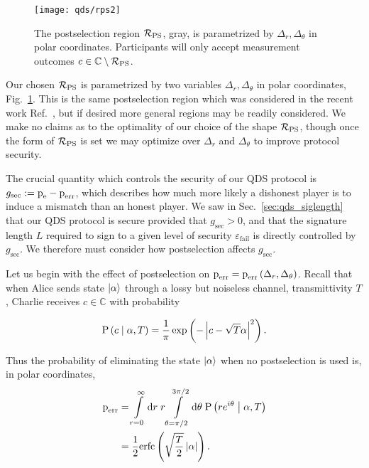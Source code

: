 \begin{figure}[htp]
\captionsetup{width=0.8\linewidth}
\centering
\texttt{[image: qds/rps2]}
\caption{\label{fig:rps} The postselection region $\mathcal{R}_{\text{PS}}$, gray, is parametrized by $\Delta_r, \Delta_\theta$ in polar coordinates. Participants will only accept measurement outcomes $c \in \mathbb{C} \setminus \mathcal{R}_{\text{PS}}$. }
\end{figure}

Our chosen $\mathcal{R}_{\text{PS}}$ is parametrized by two variables $\Delta_r, \Delta_\theta$ in polar coordinates, Fig.~\ref{fig:rps}. This is the same postselection region which was considered in the recent work Ref.~\cite{Lin2019}, but if desired more general regions may be readily considered. We make no claims as to the optimality of our choice of the shape $\mathcal{R}_{\text{PS}}$, though once the form of $\mathcal{R}_{\text{PS}}$ is set we may optimize over $\Delta_r$ and $\Delta_\theta$ to improve protocol security.

The crucial quantity which controls the security of our QDS protocol is $g_{\text{sec}} := \text{p}_{\text{e}} - \text{p}_{\text{err}}$, which describes how much more likely a dishonest player is to induce a mismatch than an honest player. We saw in Sec.~\ref{sec:qds_siglength} that our QDS protocol is secure provided that $g_{\text{sec}} > 0$, and that the signature length $L$ required to sign to a given level of security $\varepsilon_{\text{fail}}$ is directly controlled by $g_{\text{sec}}$. We therefore must consider how postselection affects $g_{\text{sec}}$. 

Let us begin with the effect of postselection on $\text{p}_{\text{err}} = \text{p}_{\text{err}}\left(\Delta_r, \Delta_\theta\right)$. %
Recall that when Alice sends state $\ket{\alpha}$ through a lossy but noiseless channel, transmittivity $T$, Charlie receives $c \in \mathbb{C}$ with probability

\begin{equation}
\text{P}\left(c \; \middle| \; \alpha, T\right) = \frac{1}{\pi} \exp\left( - \left| c - \sqrt{T}\alpha\right|^2\right).
\end{equation}

\noindent Thus the probability of eliminating the state $\ket{\alpha}$ when no postselection is used is, in polar coordinates,
\begin{align}\label{eqn:perrps_deriv_nops}
\perr &= \int\limits_{r=0}^\infty \mathrm{d}r \; r \int\limits_{\theta = \pi/2}^{3 \pi/2} \mathrm{d}\theta \; \text{P}\left(r e^{i \theta} \given \alpha, T\right) \notag \\
%
&= \frac{1}{2}\erfc\left(\sqrt{\frac{T}{2}}\left|\alpha\right|\right).
\end{align}

